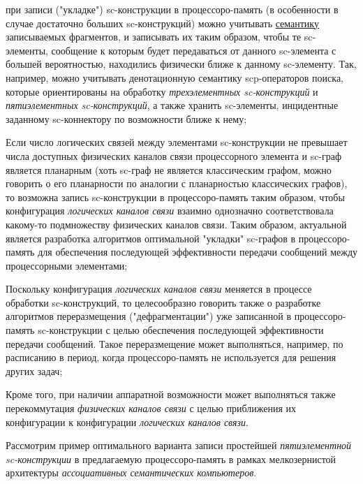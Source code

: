 \begin{textitemize}
	\item при записи ("укладке"{}) sc-конструкции в процессоро-память (в особенности в случае достаточно больших sc-конструкций) можно учитывать \underline{семантику} записываемых фрагментов, и записывать их таким образом, чтобы те sc-элементы, сообщение к которым будет передаваться от данного sc-элемента с большей вероятностью, находились физически ближе к данному sc-элементу. Так, например, можно учитывать денотационную семантику scp-операторов поиска, которые ориентированы на обработку \textit{трехэлементных sc-конструкций} и \textit{пятиэлементных sc-конструкций}, а также хранить sc-элементы, инцидентные заданному sc-коннектору по возможности ближе к нему;
	\item Если число логических связей между элементами sc-конструкции не превышает числа доступных физических каналов связи процессорного элемента и sc-граф является планарным (хоть sc-граф не является классическим графом, можно говорить о его планарности по аналогии с планарностью классических графов), то возможна запись sc-конструкции в процессоро-память таким образом, чтобы конфигурация \textit{логических каналов связи}  взаимно однозначно соответствовала какому-то подмножеству физических каналов связи. Таким образом, актуальной является разработка алгоритмов оптимальной "укладки"{} sc-графов в процессоро-память для обеспечения последующей эффективности передачи сообщений между процессорными элементами;
	\item Поскольку конфигурация \textit{логических каналов связи} меняется в процессе обработки sc-конструкций, то целесообразно говорить также о разработке алгоритмов переразмещения ("дефрагментации") уже записанной в процессоро-память sc-конструкции с целью обеспечения последующей эффективности передачи сообщений. Такое переразмещение может выполняться, например, по расписанию в период, когда процессоро-память не используется для решения других задач;
	\item Кроме того, при наличии аппаратной возможности может выполняться также перекоммутация \textit{физических каналов связи} с целью приближения их конфигурации к конфигурации \textit{логических каналов связи}.
\end{textitemize}

Рассмотрим пример оптимального варианта записи простейшей \textit{пятиэлементной sc-конструкции} в предлагаемую процессоро-память в рамках мелкозернистой архитектуры \textit{ассоциативных семантических компьютеров}.

